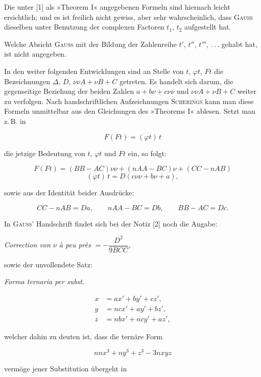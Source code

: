 \noindent\hspace*{\parindent}Die unter [1] als »Theorem I« angegebenen Formeln sind hiernach leicht
ersichtlich; und es ist freilich nicht gewiss, aber sehr wahrscheinlich, dass
\textsc{Gauss} dieselben unter Benutzung der complexen Factoren $t_1$, $t_2$
aufgestellt hat.

Welche Absicht \textsc{Gauss} mit der Bildung der Zahlenreihe $t'$, $t''$, $t'''$,
.\,.\,. gehabt hat, ist nicht angegeben.

In den weiter folgenden Entwicklungen sind an Stelle von $t$, $\varphi t$,
$Ft$ die Bezeichnungen $\Delta$, $D$, $\nu\nu A+\nu B+C$ getreten. Es handelt
sich darum, die gegenseitige Beziehung der beiden Zahlen $a+b\nu+c\nu\nu$ und
$\nu\nu A+\nu B+C$ weiter zu verfolgen. Nach handschriftlichen Aufzeichnungen
\textsc{Scherings} kann man diese Formeln unmittelbar aus den Gleichungen des
»Theorems I« ablesen. Setzt man z.\,B. in

\[
F(Ft) = (\varphi t)\,t
\]

\noindent die jetzige Bedeutung von $t$, $\varphi t$ und $Ft$ ein, so folgt:

\[
F(Ft) = (BB-AC)\nu\nu + (nAA-BC)\nu + (CC-nAB)
\]
\[
(\varphi t)\,t = D(c\nu\nu+b\nu+a),
\]

\noindent sowie aus der Identität beider Ausdrücke:

\[
CC-nAB = Da, \qquad nAA-BC = Db, \qquad BB-AC = Dc.
\]

In \textsc{Gauss}' Handschrift findet sich bei der Notiz [2] noch die Angabe:

\begin{center}\textit{Correction von $\nu$ à peu près} $= -\dfrac{D^2}{9BCC},$\end{center}

\noindent sowie der unvollendete Satz:

\begin{center}\textit{Forma ternaria per subst.}\end{center}
\[
\begin{aligned}
x &= ax'+by'+cz', \\
y &= ncx'+ay'+bz', \\
z &= nbx'+ncy'+az',
\end{aligned}
\]

\noindent welcher dahin zu deuten ist, dass die ternäre Form

\[
nnx^3+ny^3+z^3-3nxyz
\]

\noindent vermöge jener Substitution übergeht in

